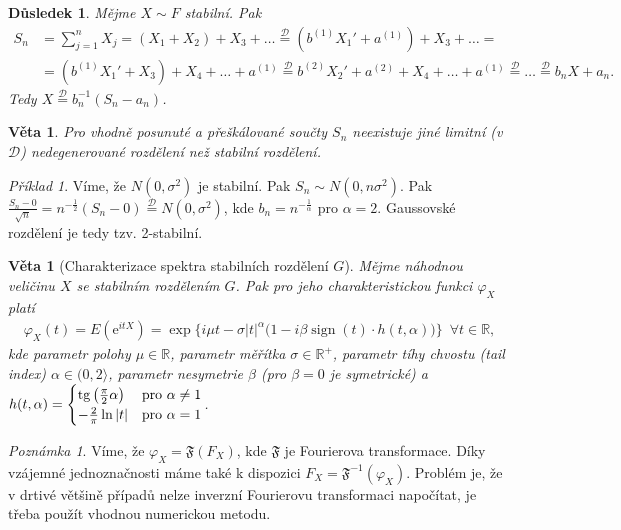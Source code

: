 \documentclass{article}
\newtheorem{theorem}[subsubsection]{Věta}
\theoremstyle{remark}
\newtheorem*{remark}{Poznámka}
\theoremstyle{plain}
\newtheorem{dusl}[subsubsection]{Důsledek}
\theoremstyle{definition}
\theoremstyle{remark}
\newtheorem*{example}{Příklad}
\DeclareMathOperator{\sign}{sign}
\DeclareMathOperator{\tg}{tg}
\begin{document}
\begin{dusl}
Mějme $X\sim F$ stabilní. Pak
\begin{align*}
    S_n&=\sum_{j=1}^n X_j=(X_1+X_2)+X_3+\dots \stackrel{\mathscr{D}}{=}(b^{(1)}X_1'+a^{(1)})+X_3+\dots= \\ &=(b^{(1)}X_1'+X_3)+X_4+\dots+a^{(1)}\stackrel{\mathscr{D}}{=}b^{(2)}X_2'+a^{(2)}+X_4+\dots+a^{(1)}\stackrel{\mathscr{D}}{=}\dots\stackrel{\mathscr{D}}{=}b_n X+a_n.
\end{align*}
Tedy $X\stackrel{\mathscr{D}}{=}b_n^{-1}(S_n-a_n)$.
\end{dusl}

\begin{theorem}
Pro vhodně posunuté a přeškálované součty $S_n$ neexistuje jiné limitní (v $\mathscr{D}$) nedegenerované rozdělení než stabilní rozdělení.  
\end{theorem}

\begin{example}
Víme, že $N(0,\sigma^2)$ je stabilní. Pak $S_n\sim N(0,n\sigma^2)$. Pak $\frac{S_n-0}{\sqrt{n}}=n^{-\frac{1}{2}}(S_n-0)\stackrel{\mathscr{D}}{=}N(0,\sigma^2)$, kde $b_n=n^{-\frac{1}{\alpha}}$ pro $\alpha=2$. Gaussovské rozdělení je tedy tzv. 2-stabilní.
\end{example}

\begin{theorem}[Charakterizace spektra stabilních rozdělení $G$]
Mějme náhodnou veličinu $X$ se stabilním rozdělením $G$. Pak pro jeho charakteristickou funkci $\varphi_X$ platí
\begin{align*}
    \varphi_X(t)=E\left(\mathrm{e}^{itX}\right)=\exp\big\{i\mu t-\sigma |t|^\alpha\big(1-i\beta\sign(t)\cdot h(t,\alpha)\big)\big\}\,\,\,\forall t\in\mathbb{R},
\end{align*}
kde parametr polohy $\mu\in\mathbb{R}$, parametr měřítka $\sigma\in\mathbb{R}^{+}$, parametr tíhy chvostu (\textit{tail index}) $\alpha\in(0,2\rangle$, parametr nesymetrie $\beta$ (pro $\beta=0$ je symetrické) a $h(t,\alpha)=\begin{cases}
\tg\left(\frac{\pi}{2}\alpha\right) & \textnormal{pro }\alpha\neq 1 \\
-\frac{2}{\pi}\ln|t| & \textnormal{pro }\alpha=1
\end{cases}$.
\end{theorem}

\begin{remark}
Víme, že $\varphi_X=\mathfrak{F}(F_X)$, kde $\mathfrak{F}$ je Fourierova transformace. Díky vzájemné jednoznačnosti máme také k dispozici $F_X=\mathfrak{F}^{-1}(\varphi_X)$. Problém je, že v drtivé většině případů nelze inverzní Fourierovu transformaci napočítat, je třeba použít vhodnou numerickou metodu.
\end{remark}
\end{document}
